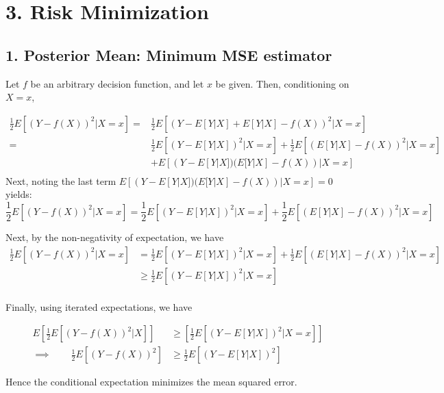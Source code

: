 \documentclass[paper=a4, fontsize=11pt]{scrartcl} %
\numberwithin{equation}{section} %
\numberwithin{figure}{section} %
\numberwithin{table}{section} %
\begin{document}

\section*{3. Risk Minimization}

\subsection*{1. Posterior Mean: Minimum MSE estimator}

Let $f$ be an arbitrary decision function, and let $x$ be given. Then, conditioning on $X = x$,

\begin{align*}
\frac{1}{2} E \left[ \left( Y - f(X) \right) ^2 | X = x \right ] =& \frac{1}{2} E \left[ \left( Y - E[Y|X] + E[Y|X] - f(X) \right) ^2 | X = x \right] \\
	=& \frac{1}{2} E \left[ \left( Y - E[Y|X] \right) ^2 | X = x \right] + \frac{1}{2} E \left[ \left( E[Y|X] - f(X) \right) ^2 | X = x \right]\\
	& + E \left[ ( Y - E[Y|X]) (E[Y|X] - f(X))  | X = x \right] \\
\end{align*}
Next, noting the last term $E \left[ ( Y - E[Y|X]) (E[Y|X] - f(X))  | X = x \right] = 0$ yields:
\[\frac{1}{2}  E \left[ \left( Y - f(X) \right) ^2 | X = x \right] = \frac{1}{2}  E \left[ \left( Y - E[Y|X] \right) ^2 | X = x \right] +\frac{1}{2}  E \left[ \left( E[Y|X] - f(X) \right) ^2 | X = x \right] \]

Next, by the non-negativity of expectation, we have
\begin{align*}
\frac{1}{2}  E \left[ \left( Y - f(X) \right) ^2 | X = x \right] &= \frac{1}{2}  E \left[ \left( Y - E[Y|X] \right) ^2 | X = x \right] +\frac{1}{2}  E \left[ \left( E[Y|X] - f(X) \right) ^2 | X = x \right] \\
	& \geq \frac{1}{2}  E \left[ \left( Y - E[Y|X] \right) ^2 | X = x \right] \\
\end{align*}

Finally, using iterated expectations, we have

\begin{align*}
E\left[ \frac{1}{2}  E \left[ \left( Y - f(X) \right) ^2 | X \right]\right] &\geq \left[\frac{1}{2}  E \left[ \left( Y - E[Y|X] \right) ^2 | X = x \right]\right] \\
\implies \qquad{} \frac{1}{2}  E \left[ \left( Y - f(X) \right) ^2 \right] & \geq \frac{1}{2}  E \left[ \left( Y - E[Y|X] \right) ^2 \right]
\end{align*}

Hence the conditional expectation minimizes the mean squared error.


\end{document}
